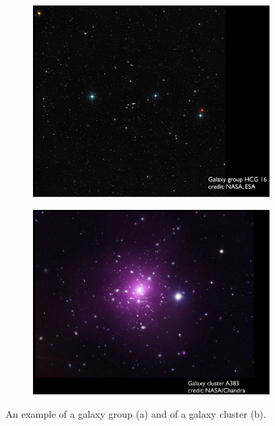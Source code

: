 \begin{figure}[H]
	\centering
		\begin{subfigure}[b]{0.49\textwidth}
			\includegraphics[width=1\linewidth]{img/ch-01/galaxygroupHCG16.png}
			\caption{}
			\label{fig:galaxygroupHCG16}
		\end{subfigure}
		\begin{subfigure}[b]{0.49\textwidth}
			\includegraphics[width=1\linewidth]{img/ch-01/galaxyclusterA383.png}
			\caption{}
			\label{fig:galaxyclusterA383}
		\end{subfigure}
\caption{An example of a galaxy group (a) and of a galaxy cluster (b).}
\end{figure}

